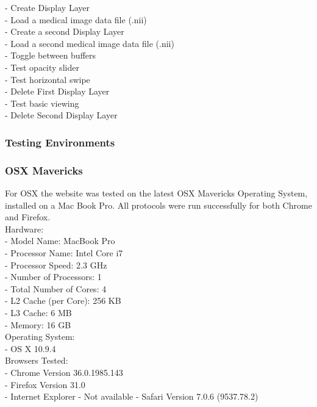 \documentclass[a4paper,11pt,twoside]{article}
\begin{document}
- Create Display Layer\\
- Load a medical image data file (.nii)\\
- Create a second Display Layer\\
- Load a second medical image data file (.nii)\\
- Toggle between buffers\\
- Test opacity slider\\
- Test horizontal swipe\\
- Delete First Display Layer\\
- Test basic viewing\\
- Delete Second Display Layer




\subsubsection{Testing Environments}


\subsubsection*{OSX Mavericks}

For OSX the website was tested on the latest OSX Mavericks Operating System, installed on a Mac Book Pro. All protocols were run successfully for both Chrome and Firefox.\\

\noindent Hardware:\\
- Model Name:	MacBook Pro\\
- Processor Name:	Intel Core i7\\
- Processor Speed:	2.3 GHz\\
- Number of Processors:	1\\
- Total Number of Cores:	4\\
- L2 Cache (per Core):	256 KB\\
- L3 Cache:	6 MB\\
- Memory:	16 GB\\


\noindent Operating System:\\
- OS X 10.9.4\\

\noindent Browsers Tested:\\
- Chrome Version 36.0.1985.143\\
- Firefox Version 31.0\\
- Internet Explorer - Not available
- Safari Version 7.0.6 (9537.78.2)\\
\end{document}
